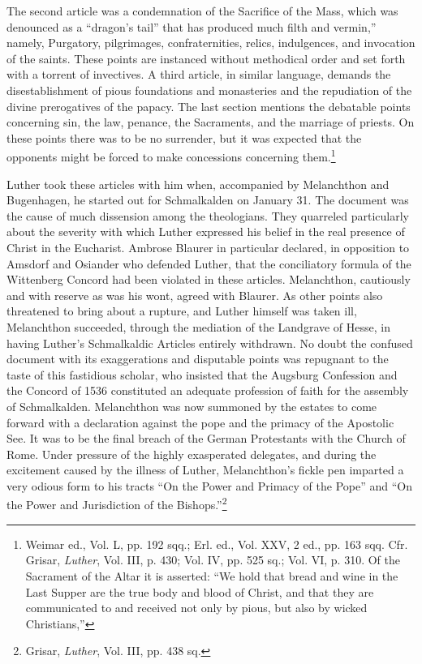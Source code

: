 The second article was a condemnation of the Sacrifice of the Mass,
which was denounced as a “dragon’s tail” that has produced much
filth and vermin,” namely, Purgatory, pilgrimages, confraternities,
relics, indulgences, and invocation of the saints. These points are instanced
without methodical order and set forth with a torrent of invectives. A
third article, in similar language, demands the disestablishment of pious
foundations and monasteries and the repudiation of
the divine prerogatives of the papacy. The last section mentions the
debatable points concerning sin, the law, penance, the Sacraments,
and the marriage of priests. On these points there was to be no surrender,
but it was expected that the opponents might be forced to
make concessions concerning them.\footnote
{Weimar ed., Vol. L, pp. 192 sqq.; Erl. ed., Vol. XXV, 2 ed., pp. 163 sqq. Cfr. Grisar,
\textit{Luther}, Vol. III, p. 430; Vol. IV, pp. 525 sq.; Vol. VI, p. 310. Of the Sacrament of the
Altar it is asserted: “We hold that bread and wine in the Last Supper are the true body
and blood of Christ, and that they are communicated to and received not only by pious, but
also by wicked Christians,”}

Luther took these articles with him when, accompanied by Melanchthon and
Bugenhagen, he started out for Schmalkalden on January 31. The document
was the cause of much dissension among the
theologians. They quarreled particularly about the severity with
which Luther expressed his belief in the real presence of Christ in the
Eucharist. Ambrose Blaurer in particular declared, in opposition to
Amsdorf and Osiander who defended Luther, that the conciliatory
formula of the Wittenberg Concord had been violated in these articles.
Melanchthon, cautiously and with reserve as was his wont,
agreed with Blaurer. As other points also threatened to bring about a
rupture, and Luther himself was taken ill, Melanchthon succeeded,
through the mediation of the Landgrave of Hesse, in having Luther’s
Schmalkaldic Articles entirely withdrawn. No doubt the confused
document with its exaggerations and disputable points was repugnant
to the taste of this fastidious scholar, who insisted that the Augsburg
Confession and the Concord of 1536 constituted an adequate profession
of faith for the assembly of Schmalkalden. Melanchthon was now
summoned by the estates to come forward with a declaration against
the pope and the primacy of the Apostolic See. It was to be the final
breach of the German Protestants with the Church of Rome. Under
pressure of the highly exasperated delegates, and during the excitement
caused by the illness of Luther, Melanchthon’s fickle pen imparted a very
odious form to his tracts “On the Power and Primacy
of the Pope” and “On the Power and Jurisdiction of the Bishops.”\footnote{Grisar, \textit{Luther}, Vol. III, pp. 438 sq.}


